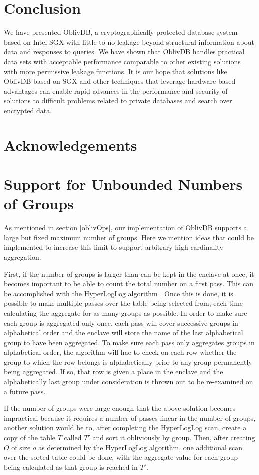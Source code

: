 \documentclass[USenglish,oneside,twocolumn]{article}
\def\name/{OblivDB}
\begin{document}
\section{Conclusion}\label{conclusion}
We have presented \name/, a cryptographically-protected database system based on Intel SGX with little to no leakage beyond structural information about data and responses to queries. We have shown that \name/ handles practical data sets with acceptable performance comparable to other existing solutions with more permissive leakage functions. It is our hope that solutions like \name/ based on SGX and other techniques that leverage hardware-based advantages can enable rapid advances in the performance and security of solutions to difficult problems related to private databases and search over encrypted data. 

\section*{Acknowledgements}






\appendix

\section{Support for Unbounded Numbers of Groups}\label{groupby}
As mentioned in section \ref{oblivOps}, our implementation of \name/ supports a large but fixed maximum number of groups. Here we mention ideas that could be implemented to increase this limit to support arbitrary high-cardinality aggregation. 

First, if the number of groups is larger than can be kept in the enclave at once, it becomes important to be able to count the total number on a first pass. This can be accomplished with the HyperLogLog algorithm \cite{FFGM07}. Once this is done, it is possible to make multiple passes over the table being selected from, each time calculating the aggregate for as many groups as possible. In order to make sure each group is aggregated only once, each pass will cover successive groups in alphabetical order and the enclave will store the name of the last alphabetical group to have been aggregated. To make sure each pass only aggregates groups in alphabetical order, the algorithm will hae to check on each row whether the group to which the row belongs is alphabetically prior to any group permanently being aggregated. If so, that row is given a place in the enclave and the alphabetically last group under consideration is thrown out to be re-examined on a future pass. 

If the number of groups were large enough that the above solution becomes impractical because it requires a number of passes linear in the number of groups, another solution would be to, after completing the HyperLogLog scan, create a copy of the table $T$ called $T'$ and sort it obliviously by group. Then, after creating $O$ of size $o$ as determined by the HyperLogLog algorithm, one additional scan over the sorted table could be done, with the aggregate value for each group being calculated as that group is reached in $T'$. 
\end{document}

